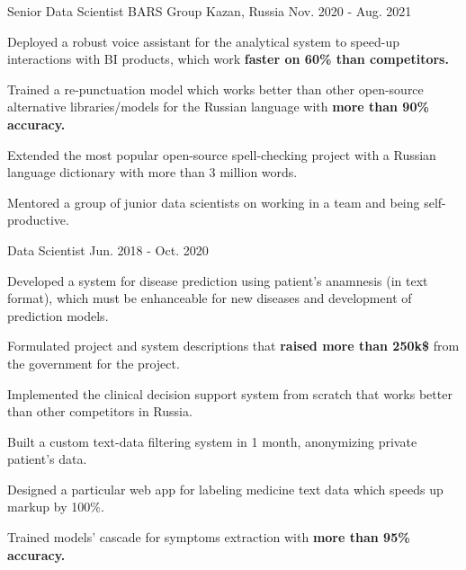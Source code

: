 \begin{cventries}
  \cventry
    {Senior Data Scientist} %
    {BARS Group} %
    {Kazan, Russia} %
    {Nov. 2020 - Aug. 2021} %
    {
      \begin{cvitems} %
        \item {Deployed a robust voice assistant for the analytical system to speed-up interactions with BI products, which work \textbf{faster on 60\% than competitors.}}
        \item {Trained a re-punctuation model which works better than other open-source alternative libraries/models for the Russian language with \textbf{more than 90\% accuracy.}}
        \item {Extended the most popular open-source spell-checking project with a Russian language dictionary with more than 3 million words.}
        \item {Mentored a group of junior data scientists on working in a team and being self-productive.}
      \end{cvitems}
    }

  \cventry
    {Data Scientist} %
    {} %
    {} %
    {Jun. 2018 - Oct. 2020} %
    {
      \begin{cvitems} %
        \item {Developed a system for disease prediction using patient's anamnesis (in text format), which must be enhanceable for new diseases and development of prediction models.}
        \item {Formulated project and system descriptions that \textbf{raised more than 250k\$} from the government for the project.}
        \item {Implemented the clinical decision support system from scratch that works better than other competitors in Russia.}
        \item {Built a custom text-data filtering system in 1 month, anonymizing private patient's data.}
        \item {Designed a particular web app for labeling medicine text data which speeds up markup by 100\%.}
        \item {Trained models' cascade for symptoms extraction with \textbf{more than 95\% accuracy.}}
      \end{cvitems}
    }


\end{cventries}
